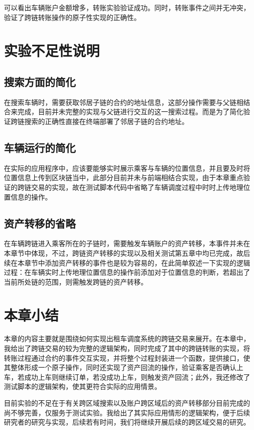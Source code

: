 可以看出车辆账户金额增多，转账实验验证成功。同时，转账事件之间并无冲突，验证了跨链转账操作的原子性实现的正确性。

\section{实验不足性说明}

\subsection{搜索方面的简化}

在搜索车辆时，需要获取邻居子链的合约的地址信息，这部分操作需要与父链相结合来完成，目前并未完整的实现与父链进行交互的这一搜索过程。而是为了简化验证跨链搜索的正确性直接在终端部署了邻居子链的合约地址。

\subsection{车辆运行的简化}

在实际的应用程序中，应该要能够实时展示乘客与车辆的位置信息，并且要及时将位置信息上传到区块链当中，此部分目前并未与前端相结合实现，由于本章重点验证的跨链交易的实现，故在测试脚本代码中省略了车辆调度过程中时时上传地理位置信息的操作。

\subsection{资产转移的省略}

在车辆跨链进入乘客所在的子链时，需要触发车辆账户的资产转移，本事件并未在本章节中体现，不过，跨链资产转移的实现以及相关测试第五章中均已完成，故后续在本章节中添加资产转移的事件也是较为容易的，在此简单叙述一下实现的逻辑过程：在车辆实时上传地理位置信息的操作前添加对于位置信息的判断，若超出了当前所处链的范围，则需触发跨链的资产转移。

\section{本章小结}

本章的内容主要就是围绕如何实现出租车调度系统的跨链交易来展开。在本章中，我给出了跨链交易的较为完整的逻辑架构，同时完成了其中的跨链转账的实现，将转账过程通过合约的事件交互实现，并将整个过程封装进一个函数，提供接口，使其整体形成一个原子操作，同时还实现了资产回流的操作，验证乘客是否确认上车，若成功上车则继续订单，若没成功上车，则触发资产回流；此外，我还修改了测试脚本的逻辑架构，使其更符合实际的应用情景。

目前实验的不足在于有关跨区域搜索以及账户跨区域后的资产转移部分目前完成的尚不够完善，仅服务于测试实验。我给出了其实际应用情形的逻辑架构，便于后续研究者的研究与实现，后续若有时间，我们将继续开展后续的跨区域交易的研究。
